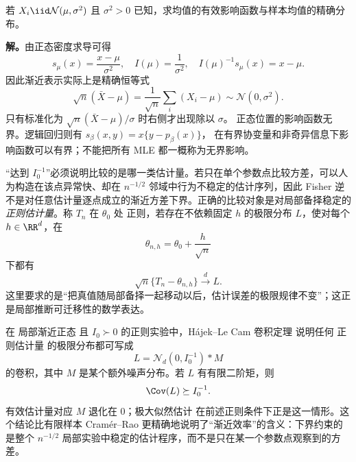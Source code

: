 \begin{workedexample}[正态均值的有效影响函数]
若 $X_i\iid\mathcal N(\mu,\sigma^2)$ 且 $\sigma^2>0$ 已知，求均值的有效影响函数与样本均值的精确分布。

\textbf{解。}由正态密度求导可得
\[
 s_\mu(x)=\frac{x-\mu}{\sigma^2},\quad
 I(\mu)=\frac1{\sigma^2},\quad
 I(\mu)^{-1}s_\mu(x)=x-\mu.
\]
因此渐近表示实际上是精确恒等式
\[
 \sqrt n(\bar X-\mu)=\frac1{\sqrt n}\sum_i(X_i-\mu)
 \sim\mathcal N(0,\sigma^2).
\]
只有标准化为 $\sqrt n(\bar X-\mu)/\sigma$ 时右侧才出现除以 $\sigma$。
正态位置的影响函数无界。逻辑回归则有 $s_\beta(x,y)=x\{y-p_\beta(x)\}$，
在有界协变量和非奇异信息下影响函数可以有界；不能把所有 MLE 都一概称为无界影响。
\end{workedexample}

\begin{definition}[局部正则估计量]
“达到 $I_0^{-1}$”必须说明比较的是哪一类估计量。若只在单个参数点比较方差，可以人为构造在该点异常快、却在 $n^{-1/2}$ 邻域中行为不稳定的估计序列，因此 Fisher 逆 不是对任意估计量逐点成立的渐近方差下界。正确的比较对象是对局部备择稳定的 \emph{正则估计量}。称 $T_n$ 在 $\theta_0$ 处 正则，若存在不依赖固定 $h$ 的极限分布 $L$，使对每个 $h\in\RR^d$，在
\[
 \theta_{n,h}=\theta_0+\frac h{\sqrt n}
\]
下都有
\begin{equation}\label{eq:math-stat-regular-estimator}
 \sqrt n\{T_n-\theta_{n,h}\}\xrightarrow{d} L.
\end{equation}
这里要求的是“把真值随局部备择一起移动以后，估计误差的极限规律不变”；这正是局部推断可迁移性的数学表达。
\end{definition}

\begin{theorem}
在 局部渐近正态 且 $I_0\succ0$ 的正则实验中，H\'ajek--Le Cam 卷积定理 说明任何 正则估计量 的极限分布都可写成
\begin{equation}\label{eq:math-stat-hajek-convolution}
 L
 =\mathcal N_d(0,I_0^{-1})*M
\end{equation}
的卷积，其中 $M$ 是某个额外噪声分布。若 $L$ 有有限二阶矩，则
\[
 \Cov(L)\succeq I_0^{-1}.
\]
有效估计量对应 $M$ 退化在 $0$；极大似然估计 在前述正则条件下正是这一情形。这个结论比有限样本 Cramér--Rao 更精确地说明了“渐近效率”的含义：下界约束的是整个 $n^{-1/2}$ 局部实验中稳定的估计程序，而不是只在某一个参数点观察到的方差。
\end{theorem}

